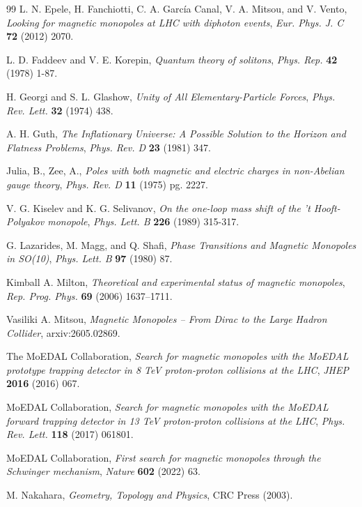 \documentclass[a4paper,11pt]{article}
\begin{document}
\begin{thebibliography}{99}
L. N. Epele, H. Fanchiotti, C. A. Garc\'ia Canal, V. A. Mitsou, and V. Vento, \emph{Looking for magnetic monopoles at LHC with diphoton events}, \emph{Eur. Phys. J. C} {\bf 72} (2012) 2070.

L. D. Faddeev and V. E. Korepin, \emph{Quantum theory of solitons}, \emph{Phys. Rep.} {\bf 42} (1978) 1-87.

H. Georgi and S. L. Glashow, \emph{Unity of All Elementary-Particle Forces}, \emph{Phys. Rev. Lett.} {\bf 32} (1974) 438.

A. H. Guth, \emph{The Inflationary Universe: A Possible Solution to the Horizon and Flatness Problems}, \emph{Phys. Rev. D} {\bf 23} (1981) 347.

Julia, B., Zee, A., \emph{Poles with both magnetic and electric charges in non-Abelian gauge theory}, \emph{Phys. Rev. D} {\bf 11} (1975) pg. 2227.

V. G. Kiselev and K. G. Selivanov, \emph{On the one-loop mass shift of the 't Hooft-Polyakov monopole}, \emph{Phys. Lett. B} {\bf 226} (1989) 315-317.

G. Lazarides, M. Magg, and Q. Shafi, \emph{Phase Transitions and Magnetic Monopoles in SO(10)}, \emph{Phys. Lett. B} {\bf 97} (1980) 87.

Kimball A. Milton, \emph{Theoretical and experimental status of magnetic monopoles}, \emph{Rep. Prog. Phys.} {\bf 69} (2006) 1637–1711.

Vasiliki A. Mitsou, \emph{Magnetic Monopoles -- From Dirac to the Large Hadron Collider}, arxiv:2605.02869.

The MoEDAL Collaboration, \emph{Search for magnetic monopoles with the MoEDAL prototype trapping detector in 8 TeV proton-proton collisions at the LHC}, \emph{JHEP} {\bf 2016} (2016) 067.

MoEDAL Collaboration, \emph{Search for magnetic monopoles with the MoEDAL forward trapping detector in 13 TeV proton-proton collisions at the LHC}, \emph{Phys. Rev. Lett.} {\bf 118} (2017) 061801.

MoEDAL Collaboration, \emph{First search for magnetic monopoles through the Schwinger mechanism}, \emph{Nature} {\bf 602} (2022) 63.

M. Nakahara, \emph{Geometry, Topology and Physics}, CRC Press (2003).


\end{thebibliography}
\end{document}
